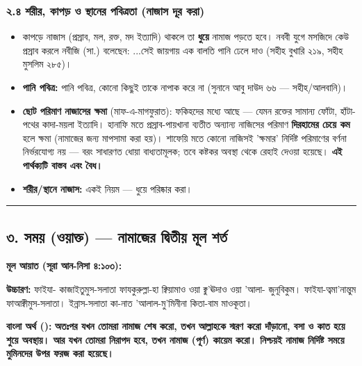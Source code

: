 \subsubsection*{২.৪ শরীর, কাপড় ও স্থানের পবিত্রতা (নাজাস দূর করা)}

\begin{itemize}
\item কাপড়ে নাজাস (প্রস্রাব, মল, রক্ত, মদ ইত্যাদি) থাকলে তা \textbf{ধুয়ে} নামাজ পড়তে হবে। নববী যুগে মসজিদে কেউ প্রস্রাব করলে নবীজি (সা.) বলেছেন: ...সেই জায়গায় এক বালতি পানি ঢেলে দাও (সহীহ বুখারি ২১৯, সহীহ মুসলিম ২৮৫)।
\item \textbf{পানি পবিত্র:} পানি পবিত্র, কোনো কিছুই তাকে নাপাক করে না (সুনানে আবু দাউদ ৬৬ — সহীহ/আলবানি)।
\item \textbf{ছোট পরিমাণ নাজাসের ক্ষমা} (মাফ-এ-মাগফুরাত): ফকিহদের মধ্যে আছে — যেমন রক্তের সামান্য ফোঁটা, হাঁটা-পথের কাদা-ময়লা ইত্যাদি। হানাফি মতে প্রস্রাব-পায়খানা ব্যতীত অন্যান্য নাজিসের পরিমাণ \textbf{দিরহামের চেয়ে কম} হলে ক্ষমা (নামাজের জন্য মাপসামা করা হয়)। শাফেয়ি মতে কোনো নাজিসই 'ক্ষমার' নির্দিষ্ট পরিমাণের বর্ণনা নির্ভরযোগ্য নয় — বরং সাধারণত ধোয়া বাধ্যতামূলক; তবে কষ্টকর অবস্থা থেকে রেহাই দেওয়া হয়েছে। \textbf{এই পার্থক্যটি বাস্তব এবং বৈধ।}
\item \textbf{শরীর/স্থানে নাজাস:} একই নিয়ম — ধুয়ে পরিষ্কার করা।
\end{itemize}
\medskip\hrule\medskip

\subsection*{৩. সময় (ওয়াক্ত) — নামাজের দ্বিতীয় মূল শর্ত}

\textbf{মূল আয়াত (সূরা আন-নিসা ৪:১০৩):}

\begin{center}\end{center}

\textbf{উচ্চারণ:} ফাইযা- কাজাইতুমুস-সলাতা ফাযকুরুল্লা-হা ক্বিয়ামাও ওয়া ক্বু'ঊদাও ওয়া 'আলা- জুনূবিকুম। ফাইযা-ত্বমা'নান্তুম ফাআক্বীমুস-সলাতা। ইন্নাস-সলাতা কা-নাত 'আলাল-মু'মিনীনা কিতা-বাম মাওকূতা।

\textbf{বাংলা অর্থ ():}
\textbf{অতঃপর যখন তোমরা নামাজ শেষ করো, তখন আল্লাহকে স্মরণ করো দাঁড়ানো, বসা ও কাত হয়ে শুয়ে অবস্থায়। আর যখন তোমরা নিরাপদ হবে, তখন নামাজ (পূর্ণ) কায়েম করো। নিশ্চয়ই নামাজ নির্দিষ্ট সময়ে মুমিনদের উপর ফরজ করা হয়েছে।}

